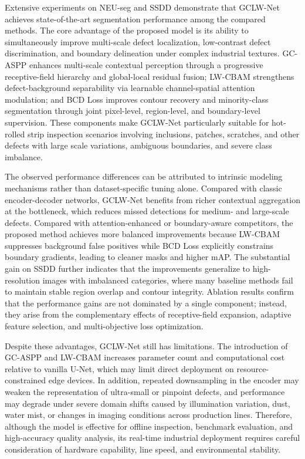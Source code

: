 \documentclass[sn-basic]{sn-jnl}
\theoremstyle{thmstyleone}%
\theoremstyle{thmstyletwo}%
\theoremstyle{thmstylethree}%
\begin{document}
Extensive experiments on NEU-seg and SSDD demonstrate that GCLW-Net achieves state-of-the-art segmentation performance among the compared methods. The core advantage of the proposed model is its ability to simultaneously improve multi-scale defect localization, low-contrast defect discrimination, and boundary delineation under complex industrial textures. GC-ASPP enhances multi-scale contextual perception through a progressive receptive-field hierarchy and global-local residual fusion; LW-CBAM strengthens defect-background separability via learnable channel-spatial attention modulation; and BCD Loss improves contour recovery and minority-class segmentation through joint pixel-level, region-level, and boundary-level supervision. These components make GCLW-Net particularly suitable for hot-rolled strip inspection scenarios involving inclusions, patches, scratches, and other defects with large scale variations, ambiguous boundaries, and severe class imbalance.

The observed performance differences can be attributed to intrinsic modeling mechanisms rather than dataset-specific tuning alone. Compared with classic encoder-decoder networks, GCLW-Net benefits from richer contextual aggregation at the bottleneck, which reduces missed detections for medium- and large-scale defects. Compared with attention-enhanced or boundary-aware competitors, the proposed method achieves more balanced improvements because LW-CBAM suppresses background false positives while BCD Loss explicitly constrains boundary gradients, leading to cleaner masks and higher mAP. The substantial gain on SSDD further indicates that the improvements generalize to high-resolution images with imbalanced categories, where many baseline methods fail to maintain stable region overlap and contour integrity. Ablation results confirm that the performance gains are not dominated by a single component; instead, they arise from the complementary effects of receptive-field expansion, adaptive feature selection, and multi-objective loss optimization.

Despite these advantages, GCLW-Net still has limitations. The introduction of GC-ASPP and LW-CBAM increases parameter count and computational cost relative to vanilla U-Net, which may limit direct deployment on resource-constrained edge devices. In addition, repeated downsampling in the encoder may weaken the representation of ultra-small or pinpoint defects, and performance may degrade under severe domain shifts caused by illumination variation, dust, water mist, or changes in imaging conditions across production lines. Therefore, although the model is effective for offline inspection, benchmark evaluation, and high-accuracy quality analysis, its real-time industrial deployment requires careful consideration of hardware capability, line speed, and environmental stability.
\end{document}
